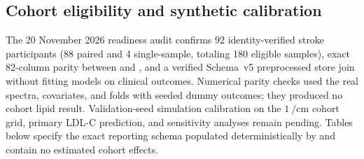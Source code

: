 \documentclass[preprint,12pt]{elsarticle}
\begin{document}
\subsection{Cohort eligibility and synthetic calibration}
\label{subsec:results_calibration}

The 20 November 2026 readiness audit confirms 92 identity-verified stroke participants (88 paired and 4 single-sample, totaling 180 eligible samples), exact 82-column parity between  and , and a verified Schema~v5 preprocessed store join without fitting models on clinical outcomes. Numerical parity checks used the real spectra, covariates, and folds with seeded dummy outcomes; they produced no cohort lipid result. Validation-seed simulation calibration on the $1~\si{\per\centi\metre}$ cohort grid, primary LDL-C prediction, and sensitivity analyses remain pending. Tables below specify the exact reporting schema populated deterministically by  and contain no estimated cohort effects.
\end{document}
